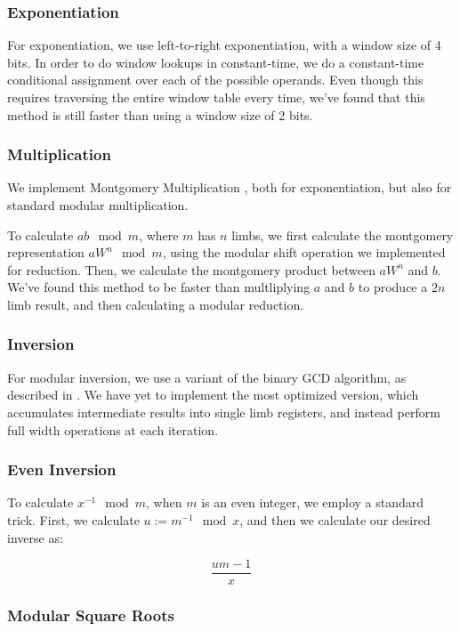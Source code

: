 \documentclass[11pt, a4paper]{article} %
\begin{document}
{\subsubsection{Exponentiation}

For exponentiation, we use left-to-right exponentiation,
with a window size of 4 bits. In order to do window lookups
in constant-time, we do a constant-time conditional assignment
over each of the possible operands. Even though this requires traversing
the entire window table every time, we've found that this method
is still faster than using a window size of 2 bits.

\subsubsection{Multiplication}

We implement Montgomery Multiplication
\cite{kaya_koc_analyzing_1996-1, pornin_bearssl_2020-1}, both
for exponentiation, but also for standard modular multiplication.

To calculate $ab \mod m$,
where $m$ has $n$ limbs, we first calculate the montgomery representation
$aW^n \mod m$, using the modular shift operation we implemented for
reduction. Then, we calculate the montgomery product
between $aW^n$ and $b$. We've found this method to be faster
than multliplying $a$ and $b$ to produce a $2n$ limb result, and then
calculating a modular reduction.

\subsubsection{Inversion}

For modular inversion, we use a variant of
the binary GCD algorithm, as described in \cite{pornin_optimized_2020}.
We have yet to implement the most optimized version, which accumulates
intermediate results into single limb registers, and instead
perform full width operations at each iteration.

\subsubsection{Even Inversion}

To calculate $x^{-1} \mod m$, when $m$ is an even integer,
we employ a standard trick. First, we calculate
$u := m^{-1} \mod x$, and then we calculate our desired inverse as:

$$
\frac{um - 1}{x}
$$

\subsubsection{Modular Square Roots}

}
\end{document}
